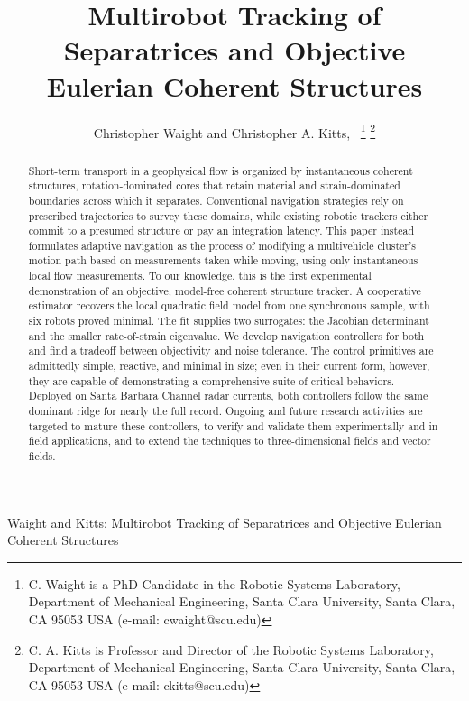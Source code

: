 \documentclass[lettersize,journal]{IEEEtran}
\begin{document}
\title{Multirobot Tracking of Separatrices and
Objective Eulerian Coherent Structures}

\author{Christopher Waight and Christopher A. Kitts,~
\thanks{C. Waight is a PhD Candidate in the Robotic Systems Laboratory, Department of Mechanical Engineering, Santa Clara University, Santa Clara, CA 95053 USA (e-mail: cwaight@scu.edu)}
\thanks{C. A. Kitts is Professor and Director of the Robotic Systems Laboratory, Department of Mechanical Engineering, Santa Clara University, Santa Clara, CA 95053 USA (e-mail: ckitts@scu.edu)}
}
%
{Waight and Kitts: Multirobot Tracking of Separatrices and Objective Eulerian Coherent Structures}

\maketitle

\begin{abstract}
Short-term transport in a geophysical flow is organized by
instantaneous coherent structures, rotation-dominated cores that
retain material and strain-dominated boundaries across which it
separates. Conventional navigation strategies rely on prescribed
trajectories to survey these domains, while existing robotic trackers
either commit to a presumed structure or pay an integration latency.
This paper instead formulates adaptive navigation as the process of
modifying a multivehicle cluster's motion path based on measurements
taken while moving, using only instantaneous local flow measurements.
To our knowledge, this is the first experimental demonstration of an
objective, model-free coherent structure tracker. A cooperative estimator
recovers the local quadratic field model from one synchronous sample,
with six robots proved minimal. The fit supplies two surrogates: the
Jacobian determinant and the smaller rate-of-strain eigenvalue. We develop
navigation controllers for both and find a tradeoff between objectivity
and noise tolerance. The control primitives are admittedly simple,
reactive, and minimal in size; even in their current form, however, they
are capable of demonstrating a comprehensive suite of critical behaviors.
Deployed on Santa Barbara Channel radar currents, both controllers follow
the same dominant ridge for nearly the full record. Ongoing and future
research activities are targeted to mature these controllers, to verify
and validate them experimentally and in field applications, and to extend
the techniques to three-dimensional fields and vector fields.
\end{abstract}
\end{document}
